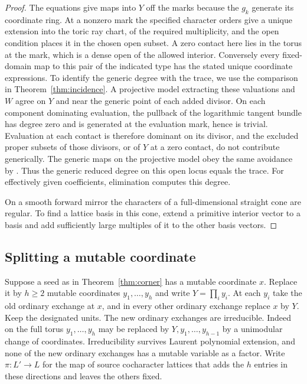 \documentclass[11pt,reqno]{amsart}
\numberwithin{equation}{section}
\theoremstyle{definition}
\theoremstyle{remark}
\begin{document}
\begin{proof}
The equations give maps into \(Y\) off the marks because the \(g_k\)
generate its coordinate ring. At a nonzero mark the specified character
orders give a unique extension into the toric ray chart, of the required
multiplicity, and the open condition places it in the chosen open subset.
A zero contact here lies in the torus at the mark, which is a dense
open of the allowed interior. Conversely every fixed-domain map to
this pair of the indicated type has the stated unique coordinate expressions.
To identify the generic degree with the trace, we use the
comparison in Theorem~\ref{thm:incidence}. A projective model
extracting these valuations and \(W\) agree on \(Y\) and near the
generic point of each added divisor. On each component dominating evaluation,
the pullback of the logarithmic tangent bundle has degree zero
and is generated at the evaluation mark, hence is trivial. Evaluation
at each contact is therefore dominant on its divisor, and the excluded
proper subsets of those divisors, or of \(Y\) at a zero contact,
do not contribute generically. The generic maps on the projective
model obey the same avoidance by \cite[Lemmas~3.6, 3.9 and 3.12]{KY}.
Thus the generic reduced degree on this open locus equals the trace.
For effectively given coefficients, elimination computes this degree.

On a smooth forward mirror the characters of a full-dimensional
straight cone are regular. To find a lattice basis in this cone, extend a primitive interior vector to a basis and add sufficiently
large multiples of it to the other basis vectors.
\end{proof}

\subsection{Splitting a mutable coordinate}\label{subsec:split-coordinate}

Suppose a seed as in Theorem~\ref{thm:corner} has a mutable coordinate
\(x\). Replace it by \(h\ge2\) mutable coordinates \(y_1,\ldots,y_h\)
and write \(Y=\prod_i y_i\). At each \(y_i\) take the old ordinary
exchange at \(x\), and in every other ordinary exchange replace \(x\)
by \(Y\). Keep the designated units. The new ordinary exchanges are
irreducible. Indeed on the full torus \(y_1,\ldots,y_h\) may be
replaced by \(Y,y_1,\ldots,y_{h-1}\) by a unimodular change of
coordinates. Irreducibility survives Laurent polynomial extension, and
none of the new ordinary exchanges has a mutable variable as a factor.
Write \(\pi:L'\to L\) for the map of source cocharacter lattices that
adds the \(h\) entries in these directions and leaves the others fixed.
\end{document}
